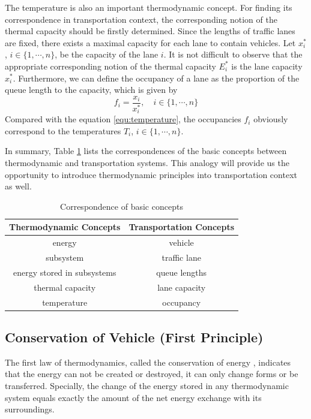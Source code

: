 \documentclass[preprint,authoryear,12pt]{elsarticle}
\begin{document}
The temperature is also an important thermodynamic concept. For
finding its correspondence in transportation context, the
corresponding notion of the thermal capacity should be firstly
determined. Since the lengths of traffic lanes are fixed, there
exists a maximal capacity for each lane to contain vehicles. Let
$x_i^*$, $i\in\{1,\cdots,n\}$, be the capacity of the lane $i$. It is
not difficult to observe that the appropriate corresponding notion of
the thermal capacity $E_i^*$ is the lane capacity $x_i^*$.
Furthermore, we can define the occupancy of a lane as the proportion
of the queue length to the capacity, which is given by
\begin{equation}\label{equ:occupancy}
f_i = \frac{x_i}{x_i^*},\quad i\in\{1,\cdots,n\}
\end{equation}
Compared with the equation \eqref{equ:temperature}, the occupancies
$f_i$ obviously correspond to the temperatures $T_i$,
$i\in\{1,\cdots,n\}$.

In summary, Table \ref{tab:notions} lists the correspondences of the
basic concepts between thermodynamic and transportation systems. This
analogy will provide us the opportunity to introduce thermodynamic
principles into transportation context as well.

\begin{table}[ht]
\centering \caption{Correspondence of basic concepts}
\label{tab:notions}
\begin{tabular}{cc}
  \hline
  Thermodynamic Concepts & Transportation Concepts \\
  \hline
  energy & vehicle \\
  subsystem & traffic lane \\
  energy stored in subsystems & queue lengths \\
  thermal capacity & lane capacity \\
  temperature & occupancy \\
  \hline
\end{tabular}
\end{table}

\subsection{Conservation of Vehicle (First Principle)}

The first law of thermodynamics, called the conservation of energy
\citep{cengel_thermodynamics:_2001}, indicates that the energy can
not be created or destroyed, it can only change forms or be
transferred. Specially, the change of the energy stored in any
thermodynamic system equals exactly the amount of the net energy
exchange with its surroundings.
\end{document}
